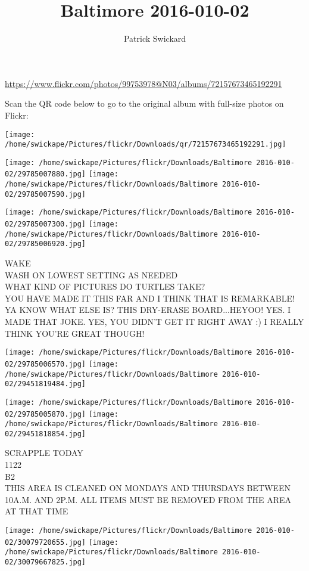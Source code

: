 \documentclass[10pt,letterpaper]{article}
\title{Baltimore 2016-010-02}
\author{Patrick Swickard}
\date{}
\begin{document}
\maketitle

\url{https://www.flickr.com/photos/99753978@N03/albums/72157673465192291}

Scan the QR code below to go to the original album with full-size photos on Flickr:

\texttt{[image: /home/swickape/Pictures/flickr/Downloads/qr/72157673465192291.jpg]}
\pagebreak

\texttt{[image: /home/swickape/Pictures/flickr/Downloads/Baltimore 2016-010-02/29785007880.jpg]}
\texttt{[image: /home/swickape/Pictures/flickr/Downloads/Baltimore 2016-010-02/29785007590.jpg]}

\texttt{[image: /home/swickape/Pictures/flickr/Downloads/Baltimore 2016-010-02/29785007300.jpg]}
\texttt{[image: /home/swickape/Pictures/flickr/Downloads/Baltimore 2016-010-02/29785006920.jpg]}

WAKE\\
WASH ON LOWEST SETTING AS NEEDED\\
WHAT KIND OF PICTURES DO TURTLES TAKE?\\
YOU HAVE MADE IT THIS FAR AND I THINK THAT IS REMARKABLE!  YA KNOW WHAT ELSE IS?  THIS DRY{-}ERASE BOARD...HEYOO! YES.  I MADE THAT JOKE.  YES, YOU DIDN'T GET IT RIGHT AWAY :) I REALLY THINK YOU'RE GREAT THOUGH!
\pagebreak

\texttt{[image: /home/swickape/Pictures/flickr/Downloads/Baltimore 2016-010-02/29785006570.jpg]}
\texttt{[image: /home/swickape/Pictures/flickr/Downloads/Baltimore 2016-010-02/29451819484.jpg]}

\texttt{[image: /home/swickape/Pictures/flickr/Downloads/Baltimore 2016-010-02/29785005870.jpg]}
\texttt{[image: /home/swickape/Pictures/flickr/Downloads/Baltimore 2016-010-02/29451818854.jpg]}

SCRAPPLE TODAY\\
1122\\
B2\\
THIS AREA IS CLEANED ON MONDAYS AND THURSDAYS BETWEEN 10A.M. AND 2P.M. ALL ITEMS MUST BE REMOVED FROM THE AREA AT THAT TIME
\pagebreak

\texttt{[image: /home/swickape/Pictures/flickr/Downloads/Baltimore 2016-010-02/30079720655.jpg]}
\texttt{[image: /home/swickape/Pictures/flickr/Downloads/Baltimore 2016-010-02/30079667825.jpg]}
\end{document}
